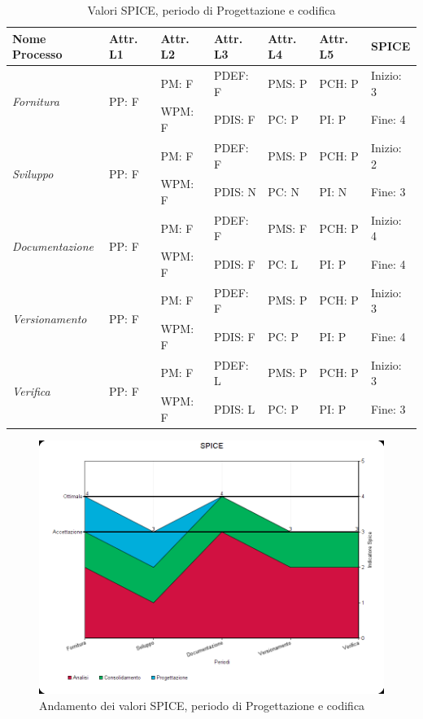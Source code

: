 \documentclass[openany,12pt,a4paper]{report}
\begin{document}
\begin{table}[h]
	\begin{center}
		\setlength\LTleft{-22mm}
		\begin{longtable}{|p{35mm}|p{20mm}|p{20mm}|p{20mm}|p{20mm}|p{20mm}|p{20mm}|}
			\hline
			\textbf{Nome Processo} & \textbf{Attr. L1} & \textbf{Attr. L2} & \textbf{Attr. L3} & \textbf{Attr. L4} & \textbf{Attr. L5} & \textbf{SPICE}\\
			\hline
			\multirow{2}{*}{\textit{Fornitura}} & \multirow{2}{*}{PP: F} & PM: F & PDEF: F & PMS: P & PCH: P & Inizio: 3\\  
			\cline{3-7}
			&          & WPM: F & PDIS: F & PC: P & PI: P & Fine: 4 \\ 
			\hline
			\multirow{2}{*}{\textit{Sviluppo}} & \multirow{2}{*}{PP: F} & PM: F & PDEF: F & PMS: P & PCH: P & Inizio: 2\\  \cline{3-7}
			&          & WPM: F & PDIS: N & PC: N & PI: N & Fine: 3\\
			\hline\multirow{2}{*}{\textit{Documentazione}} & \multirow{2}{*}{PP: F} & PM: F & PDEF: F & PMS: F & PCH: P & Inizio: 4\\  \cline{3-7}
			&          & WPM: F & PDIS: F & PC: L & PI: P & Fine: 4\\ 
			\hline\multirow{2}{*}{\textit{Versionamento}} & \multirow{2}{*}{PP: F} & PM: F & PDEF: F & PMS: P & PCH: P & Inizio: 3\\  \cline{3-7}
			&          & WPM: F & PDIS: F & PC: P & PI: P & Fine: 4\\ 
			\hline\multirow{2}{*}{\textit{Verifica}} & \multirow{2}{*}{PP: F} & PM: F & PDEF: L & PMS: P & PCH: P & Inizio: 3\\  \cline{3-7}
			&          & WPM: F & PDIS: L & PC: P & PI: P & Fine: 3\\ 
			\hline       
		\end{longtable}
	\end{center}
	\caption{Valori SPICE, periodo di Progettazione e codifica} 
\end{table}

\begin{figure}[H]
	\includegraphics[scale=0.5]{Spice/spice-progettazione}
	\centering
	\caption{Andamento dei valori SPICE, periodo di Progettazione e codifica}
\end{figure}
\end{document}
